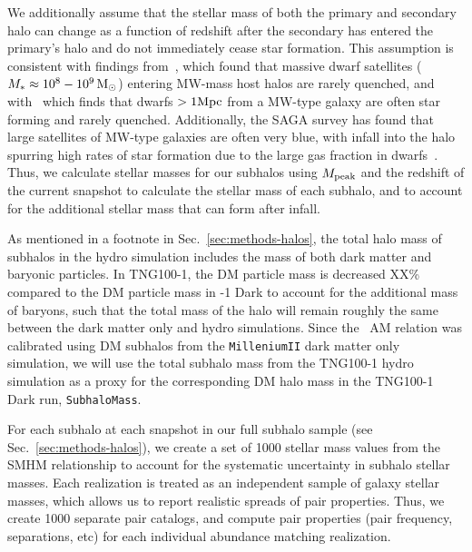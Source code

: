 \documentclass[twocolumn]{aastex631}
\begin{document}
    We additionally assume that the stellar mass of both the primary and secondary halo can change as a function of redshift after the secondary has entered the primary's halo and do not immediately cease star formation. 
    This assumption is consistent with findings from~\cite{Akins2021}, which found that massive dwarf satellites ($M_*\approx 10^8-10^9\, \mathrm{M}_\odot$) entering MW-mass host halos are rarely quenched, and with~\cite{geha13} which finds that dwarfs $>1\mathrm{Mpc}$ from a MW-type galaxy are often star forming and rarely quenched.
    Additionally, the SAGA survey has found that large satellites of MW-type galaxies are often very blue, with infall into the halo spurring high rates of star formation due to the large gas fraction in dwarfs~\citep{saga}. 
    Thus, we calculate stellar masses for our subhalos using $M_{\rm peak}$ and the redshift of the current snapshot to calculate the stellar mass of each subhalo, and to account for the additional stellar mass that can form after infall. 

    As mentioned in a footnote in Sec.~\ref{sec:methods-halos}, the total halo mass of subhalos in the hydro simulation includes the mass of both dark matter and baryonic particles. 
    In TNG100-1, the DM particle mass is decreased XX\% compared to the DM particle mass in -1 Dark to account for the additional mass of baryons, such that the total mass of the halo will remain roughly the same between the dark matter only and hydro simulations. 
    Since the~\citet{Moster2013} AM relation was calibrated using DM subhalos from the \texttt{MilleniumII} dark matter only simulation, we will use the total subhalo mass from the TNG100-1 hydro simulation as a proxy for the corresponding DM halo mass in the TNG100-1 Dark run, \texttt{SubhaloMass}. 

    For each subhalo at each snapshot in our full subhalo sample (see Sec.~\ref{sec:methods-halos}), we create a set of 1000 stellar mass values from the SMHM relationship to account for the systematic uncertainty in subhalo stellar masses.
    Each realization is treated as an independent sample of galaxy stellar masses, which allows us to report realistic spreads of pair properties.
    Thus, we create 1000 separate pair catalogs, and compute pair properties (pair frequency, separations, etc) for each individual abundance matching realization.

\end{document}
